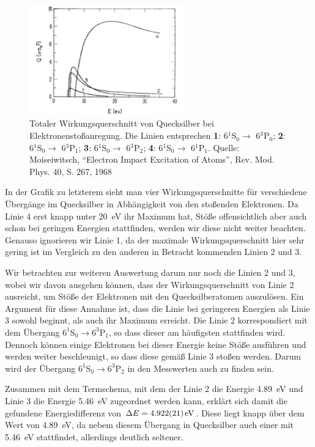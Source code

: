 \documentclass[11pt, a4paper]{article}
\begin{document}
\begin{figure}[h]
\centering
\includegraphics[width=0.6\textwidth]{./figures/wirkungsquerschnitt_hg.pdf}
\caption{Totaler Wirkungsquerschnitt von Quecksilber bei Elektronenstoßanregung. Die Linien entsprechen \textbf{1}: 6$^1$S$_0 \rightarrow$ 6$^3$P$_0$; \textbf{2}: 6$^1$S$_0 \rightarrow$ 6$^3$P$_1$; \textbf{3}: 6$^1$S$_0 \rightarrow$ 6$^3$P$_2$; \textbf{4}: 6$^1$S$_0 \rightarrow$ 6$^1$P$_1$. Quelle: Moiseiwitsch,
"`Electron Impact Excitation of Atoms"', Rev. Mod. Phys. 40, S. 267, 1968}
\label{fig:wirkungsquerschnitt_hg}
\end{figure}
In der Grafik zu letzterem sieht man vier Wirkungsquerschnitte für verschiedene Übergänge im Quecksilber in Abhängigkeit von den stoßenden Elektronen.
Da Linie 4 erst knapp unter \SI{20}{\electronvolt} ihr Maximum hat, Stöße offensichtlich aber auch schon bei geringen Energien stattfinden, werden wir diese nicht weiter beachten.
Genauso ignorieren wir Linie 1, da der maximale Wirkungsquerschnitt hier sehr gering ist im Vergleich zu den anderen in Betracht kommenden Linien 2 und 3.

Wir betrachten zur weiteren Auswertung darum nur noch die Linien 2 und 3, wobei wir davon ausgehen können, dass der Wirkungsquerschnitt von Linie 2 ausreicht, um Stöße der Elektronen mit den Quecksilberatomen auszulösen.
Ein Argument für diese Annahme ist, dass die Linie bei geringeren Energien als Linie 3 sowohl beginnt, als auch ihr Maximum erreicht.
Die Linie 2 korrespondiert mit dem Übergang $6^1$S$_0\rightarrow6^3$P$_1$, so dass dieser am häufigsten stattfinden wird.
Dennoch können einige Elektronen bei dieser Energie keine Stöße ausführen und werden weiter beschleunigt, so dass diese gemäß Linie 3 stoßen werden.
Darum wird der Übergang $6^1$S$_0\rightarrow6^3$P$_2$ in den Messwerten auch zu finden sein.

Zusammen mit dem Termschema, mit dem der Linie 2 die Energie \SI{4.89}{\electronvolt} und Linie 3 die Energie \SI{5.46}{\electronvolt} zugeordnet werden kann, erklärt sich damit die gefundene Energiedifferenz von $\Delta E = \SI{4.922+-0.021}{\electronvolt}$.
Diese liegt knapp über dem Wert von \SI{4.89}{\electronvolt}, da nebem diesem Übergang in Quecksilber auch einer mit \SI{5.46}{\electronvolt} stattfindet, allerdings deutlich seltener.
\end{document}
